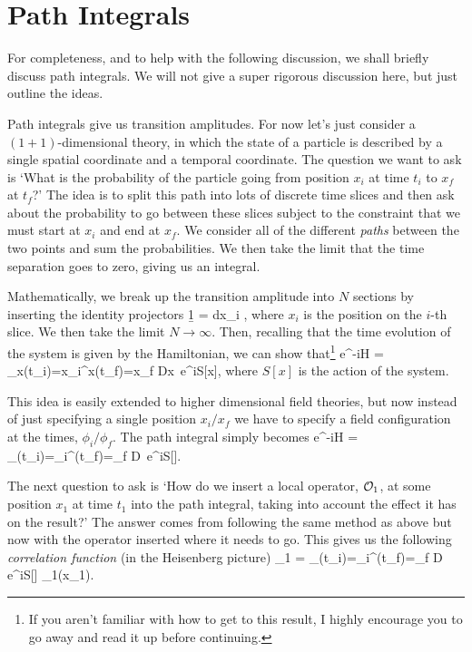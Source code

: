 \section{Path Integrals}

For completeness, and to help with the following discussion, we shall briefly discuss path integrals. We will not give a super rigorous discussion here, but just outline the ideas. 

Path integrals give us transition amplitudes. For now let's just consider a $(1+1)$-dimensional theory, in which the state of a particle is described by a single spatial coordinate and a temporal coordinate. The question we want to ask is `What is the probability of the particle going from position $x_i$ at time $t_i$ to $x_f$ at $t_f$?' The idea is to split this path into lots of discrete time slices and then ask about the probability to go between these slices subject to the constraint that we must start at $x_i$ and end at $x_f$. We consider all of the different \textit{paths} between the two points and sum the probabilities. We then take the limit that the time separation goes to zero, giving us an integral. 

Mathematically, we break up the transition amplitude into $N$ sections by inserting the identity projectors 
\be
\label{eqn:BasesStates}
    \b1 = \int dx_i ,
\ee 
where $x_i$ is the position on the $i$-th slice. We then take the limit $N\to\infty$. Then, recalling that the time evolution of the system is given by the Hamiltonian, we can show that\footnote{If you aren't familiar with how to get to this result, I highly encourage you to go away and read it up before continuing.} 
\bse 
     e^{-iH} = \int_{x(t_i)=x_i}^{x(t_f)=x_f} Dx\, e^{iS[x]},
\ese 
where $S[x]$ is the action of the system. 

This idea is easily extended to higher dimensional field theories, but now instead of just specifying a single position $x_i/x_f$ we have to specify a field configuration at the times, $\phi_i/\phi_f$. The path integral simply becomes 
\bse 
     e^{-iH} = \int_{\phi(t_i)=\phi_i}^{\phi(t_f)=\phi_f} D\phi \, e^{iS[\phi]}.
\ese 

The next question to ask is `How do we insert a local operator, $\mathcal{O}_1$, at some position $x_1$ at time $t_1$ into the path integral, taking into account the effect it has on the result?' The answer comes from following the same method as above but now with the operator inserted where it needs to go. This gives us the following \textit{correlation function} (in the Heisenberg picture) 
\bse 
     \cO_1  = \int_{\phi(t_i)=\phi_i}^{\phi(t_f)=\phi_f} D\phi \, e^{iS[\phi]} \cO_1(x_1).
\ese 

